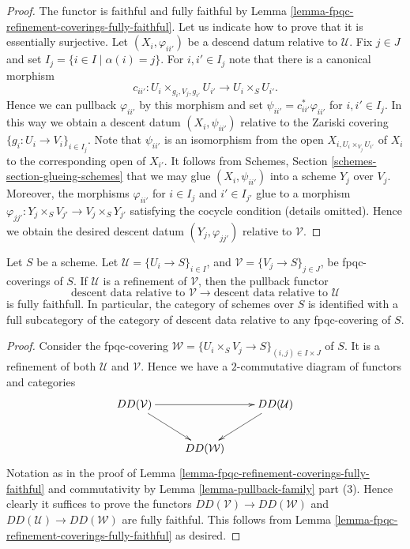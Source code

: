 \begin{proof}
The functor is faithful and fully faithful by
Lemma \ref{lemma-fpqc-refinement-coverings-fully-faithful}.
Let us indicate how to prove that it is essentially surjective.
Let $(X_i, \varphi_{ii'})$ be a descend datum relative to $\mathcal{U}$.
Fix $j \in J$ and set $I_j = \{i \in I \mid \alpha(i) = j\}$.
For $i, i' \in I_j$ note that there is a canonical morphism
$$
c_{ii'} : U_i \times_{g_i, V_j, g_{i'}} U_{i'} \to U_i \times_S U_{i'}.
$$
Hence we can pullback $\varphi_{ii'}$ by this morphism
and set $\psi_{ii'} = c_{ii'}^*\varphi_{ii'}$ for $i, i' \in I_j$.
In this way we obtain a descent datum $(X_i, \psi_{ii'})$
relative to the Zariski covering
$\{g_i : U_i \to V_i\}_{i \in I_j}$.
Note that $\psi_{ii'}$ is an isomorphism from the open
$X_{i, U_i \times_{V_j} U_{i'}}$ of $X_i$ to the corresponding
open of $X_{i'}$. It follows from
Schemes, Section \ref{schemes-section-glueing-schemes}
that we may glue $(X_i, \psi_{ii'})$ into a scheme
$Y_j$ over $V_j$. Moreover, the morphisms $\varphi_{ii'}$
for $i \in I_j$ and $i' \in I_{j'}$ glue to a morphism
$\varphi_{jj'} : Y_j \times_S V_{j'} \to V_j \times_S Y_{j'}$
satisfying the cocycle condition (details omitted).
Hence we obtain the desired descent datum
$(Y_j, \varphi_{jj'})$ relative to $\mathcal{V}$.
\end{proof}

\begin{lemma}
\label{lemma-refine-coverings-fully-faithful}
Let $S$ be a scheme.
Let $\mathcal{U} = \{U_i \to S\}_{i \in I}$, and
$\mathcal{V} = \{V_j \to S\}_{j \in J}$,
be fpqc-coverings of $S$.
If $\mathcal{U}$ is a refinement of $\mathcal{V}$,
then the pullback functor
$$
\text{descent data relative to }
\mathcal{V}
\longrightarrow
\text{descent data relative to }
\mathcal{U}
$$
is fully faithfull.
In particular, the category of schemes over $S$
is identified with a full subcategory of the category
of descent data relative to any fpqc-covering of $S$.
\end{lemma}

\begin{proof}
Consider the fpqc-covering
$\mathcal{W} = \{U_i \times_S V_j \to S\}_{(i, j) \in I \times J}$ of $S$.
It is a refinement of both $\mathcal{U}$ and $\mathcal{V}$.
Hence we have a $2$-commutative diagram of functors and categories
$$
\xymatrix{
DD(\mathcal{V}) \ar[rd] \ar[rr] & & DD(\mathcal{U}) \ar[ld] \\
& DD(\mathcal{W}) &
}
$$
Notation as in the proof of
Lemma \ref{lemma-fpqc-refinement-coverings-fully-faithful} and
commutativity by Lemma \ref{lemma-pullback-family} part (3).
Hence clearly it suffices to prove the functors
$DD(\mathcal{V}) \to DD(\mathcal{W})$ and
$DD(\mathcal{U}) \to DD(\mathcal{W})$ are fully faithful.
This follows from
Lemma \ref{lemma-fpqc-refinement-coverings-fully-faithful}
as desired.
\end{proof}

